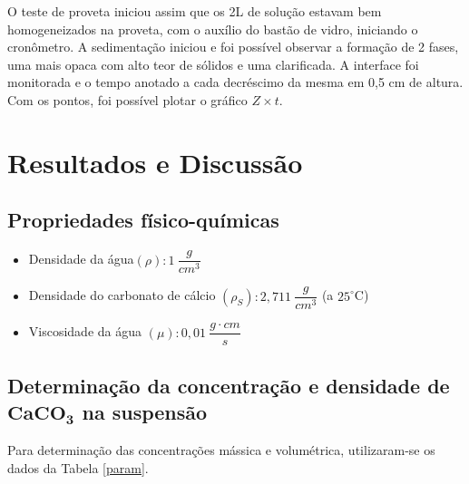 O teste de proveta iniciou assim que os 2L de solução estavam bem homogeneizados na proveta, com o auxílio do bastão de vidro, iniciando o cronômetro. A sedimentação iniciou e foi possível observar a formação de 2 fases, uma mais opaca com alto teor de sólidos e uma clarificada. A interface foi monitorada e o tempo anotado a cada decréscimo da mesma em 0,5 cm de altura. Com os pontos, foi possível plotar o gráfico $ Z \times t $.




\chapter{Resultados e Discussão}

\section{Propriedades físico-químicas}

\begin{itemize}
\item Densidade da água$  (\rho): 1 \ \dfrac{g}{cm^{3}} $
\item Densidade do carbonato de cálcio $ (\rho _{S}): 2,711 \ \dfrac{g}{cm^{3}} $ (a $ 25^{\circ} $C)
\item Viscosidade da água $ (\mu): 0,01 \ \dfrac{g \cdot cm}{s}$ 
\end{itemize}




\section{Determinação da concentração e densidade de $ \mathbf{CaCO_{3}} $ na suspensão}


Para determinação das concentrações mássica e volumétrica, utilizaram-se os dados da Tabela \ref{param}.












